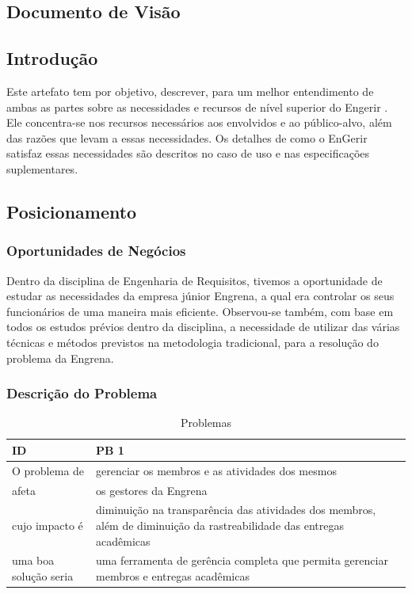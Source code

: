 \begin{apendicesenv}
\chapter{Documento de Visão}

\section{Introdução}

Este artefato tem por objetivo, descrever, para um melhor entendimento de ambas as partes
sobre as necessidades e recursos de nível superior do Engerir . Ele concentra-se nos recursos necessários aos envolvidos e ao público-alvo, além das razões que levam a essas necessidades. Os detalhes de como o EnGerir satisfaz essas necessidades são descritos no caso de uso e nas especificações suplementares.

\section{Posicionamento}
\subsection{Oportunidades de Negócios}

Dentro da disciplina de Engenharia de Requisitos, tivemos a oportunidade de estudar as necessidades da empresa júnior Engrena, a qual era controlar os seus funcionários de uma maneira mais eficiente.
Observou-se também, com base em todos os estudos prévios dentro da disciplina, a necessidade de utilizar das várias técnicas e métodos previstos na metodologia tradicional, para a resolução do problema da Engrena.


\subsection{Descrição do Problema}


\begin{table}[!h]
\centering
\caption{Problemas}
\label{problem}
\begin{tabular}{|p{7cm}|p{7cm}|}
\hline
ID                    & PB 1                                                                                                                  \\ \hline
O problema de         & gerenciar os membros e as atividades dos mesmos                                                                       \\ \hline
afeta                 & os gestores da Engrena                                                                                                \\ \hline
cujo impacto é        & diminuição na transparência das atividades dos membros, além de diminuição da rastreabilidade das entregas acadêmicas \\ \hline
uma boa solução seria & uma ferramenta de gerência completa que permita gerenciar membros e entregas acadêmicas                               \\ \hline
\end{tabular}
\end{table}


\end{apendicesenv}
